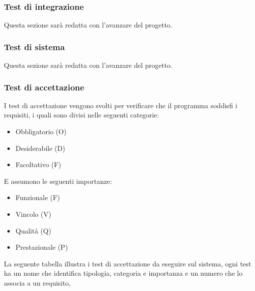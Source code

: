 \subsubsection{Test di integrazione}
Questa sezione sarà redatta con l'avanzare del progetto.
\subsubsection{Test di sistema}
Questa sezione sarà redatta con l'avanzare del progetto.
\subsubsection{Test di accettazione}
I test di accettazione vengono svolti per verificare che il programma soddisfi i requisiti, i quali sono divisi nelle seguenti categorie:
\begin{itemize}
    \item Obbligatorio (O)
    \item Desiderabile (D)
    \item Facoltativo (F)
\end{itemize}
E assumono le seguenti importanze:
\begin{itemize}
    \item Funzionale (F)
    \item Vincolo (V)
    \item Qualit\`a (Q)
    \item Prestazionale (P)
\end{itemize}
\newpage
La seguente tabella illustra i test di accettazione da eseguire sul sistema, ogni test ha un nome che identifica tipologia, categoria e importanza e un numero che lo associa a un requisito,

